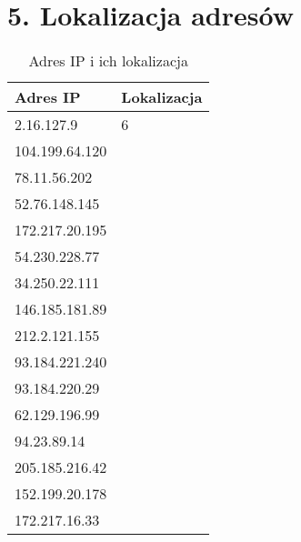 \documentclass[12pt, a4paper]{article}
\begin{document}
\section*{5. Lokalizacja adresów}
\begin{table}[h]
    \centering
    \footnotesize
    \begin{tabular}{l | l}
        Adres IP & Lokalizacja \\ \hline
        2.16.127.9 & 6 \\
        104.199.64.120 &  \\
        78.11.56.202 &  \\
        52.76.148.145 &  \\
        172.217.20.195 &  \\
        54.230.228.77 &  \\
        34.250.22.111 &  \\
        146.185.181.89 &  \\
        212.2.121.155 &  \\
        93.184.221.240 &  \\
        93.184.220.29 &  \\
        62.129.196.99 &  \\
        94.23.89.14 &  \\
        205.185.216.42 &  \\
        152.199.20.178 &  \\
        172.217.16.33 &  \\
        \end{tabular}
    \caption{Adres IP i ich lokalizacja}
\end{table}
\end{document}
